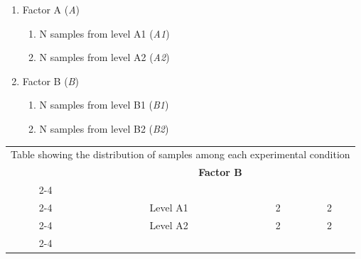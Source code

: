 \documentclass[12pt]{article}
\begin{document}
\begin{enumerate}
 \item Factor A (\emph{A})%
    \begin{enumerate}
      \item N samples from level A1 (\emph{A1})%
      \item N samples from level A2 (\emph{A2})%
    \end{enumerate}
 \item Factor B (\emph{B})%
    \begin{enumerate}
      \item N samples from level B1 (\emph{B1})%
      \item N samples from level B2 (\emph{B2})%
    \end{enumerate}
\end{enumerate}



\begin{table}[h]
\begin{tabular}{cccc}
\multicolumn{4}{c}{Table showing the distribution of samples among each experimental condition} \\
 & \multicolumn{3}{c}{\textbf{Factor B}} \\ \cline{2-4} 
\multicolumn{1}{c |}{} & \multicolumn{1}{c|}{\cellcolor[HTML]{BFC0E1}} & \multicolumn{1}{p{5cm}|}{\cellcolor[HTML]{BFC0E1}\centering{\vspace{0cm}Level B1}} & \multicolumn{1}{p{5cm}|}{\cellcolor[HTML]{BFC0E1}{\color[HTML]{000000} \centering{ \hspace{1.5cm}Level B2}}} \\ \cline{2-4} 
\multicolumn{1}{c |}{} & \multicolumn{1}{c|}{\cellcolor[HTML]{BFC0E1}
Level A1} & \multicolumn{1}{c|}{	2	} & \multicolumn{1}{c|}{	2	} \\ \cline{2-4}    %
\multicolumn{1}{c |}{\multirow{-3}{*}{\textbf{Factor A}}} & \multicolumn{1}{c|}{\cellcolor[HTML]{BFC0E1}
Level A2} & \multicolumn{1}{c|}{	2	} & \multicolumn{1}{c|}{	2	} \\ \cline{2-4}    %
\end{tabular}
\end{table}
\newpage
\end{document}
